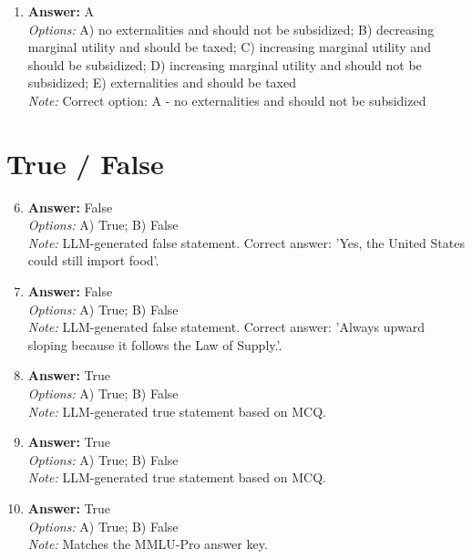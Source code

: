 \documentclass[12pt]{article}
\begin{document}
\begin{enumerate}[label=\arabic*.]
\\ \textit{Note:} Correct option: C - They were disturbed by the wide spread poverty and the fluctuations of the business cycle.
\item \textbf{Answer:} A
\\ \textit{Options:} A) no externalities and should not be subsidized; B) decreasing marginal utility and should be taxed; C) increasing marginal utility and should be subsidized; D) increasing marginal utility and should not be subsidized; E) externalities and should be taxed
\\ \textit{Note:} Correct option: A - no externalities and should not be subsidized
\end{enumerate}

\section*{True / False}
\begin{enumerate}[label=\arabic*.]
\setcounter{enumi}{5}
\item \textbf{Answer:} False
\\ \textit{Options:} A) True; B) False
\\ \textit{Note:} LLM-generated false statement. Correct answer: 'Yes, the United States could still import food'.
\item \textbf{Answer:} False
\\ \textit{Options:} A) True; B) False
\\ \textit{Note:} LLM-generated false statement. Correct answer: 'Always upward sloping because it follows the Law of Supply.'.
\item \textbf{Answer:} True
\\ \textit{Options:} A) True; B) False
\\ \textit{Note:} LLM-generated true statement based on MCQ.
\item \textbf{Answer:} True
\\ \textit{Options:} A) True; B) False
\\ \textit{Note:} LLM-generated true statement based on MCQ.
\item \textbf{Answer:} True
\\ \textit{Options:} A) True; B) False
\\ \textit{Note:} Matches the MMLU-Pro answer key.
\end{enumerate}
\end{document}
